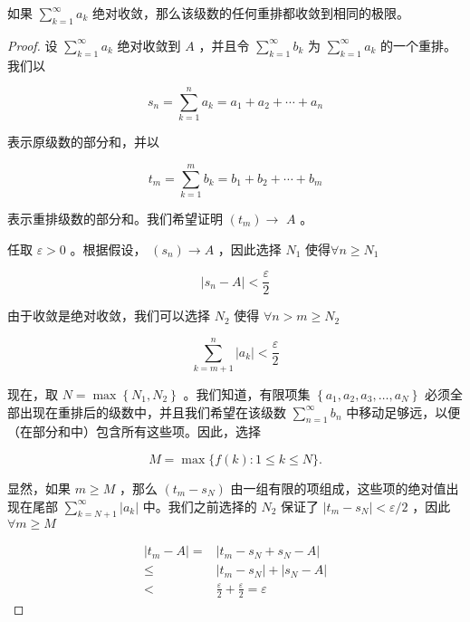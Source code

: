 \begin{Def}
  \label{thm:2.7.10}
  如果 \(\mathop{\sum }\limits_{{k = 1}}^{\infty }{a}_{k}\) 绝对收敛，那么该级数的任何重排都收敛到相同的极限。
\end{Def}

\begin{proof}
设 \(\mathop{\sum }\limits_{{k = 1}}^{\infty }{a}_{k}\) 绝对收敛到 \(A\) ，并且令 \(\mathop{\sum }\limits_{{k = 1}}^{\infty }{b}_{k}\) 为 \(\mathop{\sum }\limits_{{k = 1}}^{\infty }{a}_{k}\) 的一个重排。我们以

\[
{s}_{n} = \mathop{\sum }\limits_{{k = 1}}^{n}{a}_{k} = {a}_{1} + {a}_{2} + \cdots  + {a}_{n}
\]

表示原级数的部分和，并以

\[
{t}_{m} = \mathop{\sum }\limits_{{k = 1}}^{m}{b}_{k} = {b}_{1} + {b}_{2} + \cdots  + {b}_{m}
\]

表示重排级数的部分和。我们希望证明 \(\left( {t}_{m}\right)  \rightarrow\)  \(A\) 。

任取 \(\varepsilon  > 0\) 。根据假设， \(\left( {s}_{n}\right)  \rightarrow  A\) ，因此选择 \({N}_{1}\) 使得\(\forall n \geq  {N}_{1}\) 

\[
\left| {{s}_{n} - A}\right|  < \frac{\varepsilon }{2}
\]

由于收敛是绝对收敛，我们可以选择 \({N}_{2}\) 使得 $\forall n> m \ge N_2$

\[
\mathop{\sum }\limits_{{k = m + 1}}^{n}\left| {a}_{k}\right|  < \frac{\varepsilon }{2}
\]

现在，取 \(N = \max \left\{  {{N}_{1},{N}_{2}}\right\}\) 。我们知道，有限项集 \(\left\{  {{a}_{1},{a}_{2},{a}_{3},\ldots ,{a}_{N}}\right\}\) 必须全部出现在重排后的级数中，并且我们希望在该级数 \(\mathop{\sum }\limits_{{n = 1}}^{\infty }{b}_{n}\) 中移动足够远，以便（在部分和中）包含所有这些项。因此，选择

\[
M = \max \{ f\left( k\right)  : 1 \leq  k \leq  N\} .
\]

显然，如果 \(m \geq  M\) ，那么 \(\left( {{t}_{m} - {s}_{N}}\right)\) 由一组有限的项组成，这些项的绝对值出现在尾部 \(\mathop{\sum }\limits_{{k = N + 1}}^{\infty }\left| {a}_{k}\right|\) 中。我们之前选择的 \({N}_{2}\) 保证了 \(\left| {{t}_{m} - {s}_{N}}\right|  < \varepsilon /2\) ，因此 $\forall m\ge M$

\begin{align*}
\left| {{t}_{m} - A}\right|  = & \left| {{t}_{m} - {s}_{N} + {s}_{N} - A}\right|\\
\leq & \left| {{t}_{m} - {s}_{N}}\right|  + \left| {{s}_{N} - A}\right|\\
< & \frac{\varepsilon }{2} + \frac{\varepsilon }{2} = \varepsilon
\end{align*}
\end{proof}

